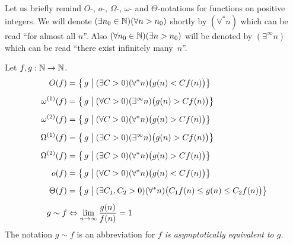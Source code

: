 		Let us briefly remind $O$-, $o$-, $\Omega$-, $\omega$- and $\Theta$-notations for functions on positive integers. We will denote $(\exists n_0 \in \N) (\forall n > n_0)$ shortly by $(\forall^* n)$ which can be read ``for almost all $n$''. Also $(\forall n_0 \in \N) (\exists n > n_0)$ will be denoted by $(\exists^\infty n)$ which can be read ``there exist infinitely many~$n$''.
		\begin{defn}
		\label{def:O}
		Let $f, g: \N \rightarrow \N$.
		\begin{align*}
			O(f) &= \bigl\{\, g \bigm| (\exists C > 0) (\forall^* n) \bigl(g(n) < C f(n)\bigr)\bigr\} \\[5pt]
			\omega^{(1)}(f) &= \bigl\{\, g \bigm| (\forall C > 0) (\exists^\infty n) \bigl(g(n) > C f(n)\bigr)\bigr\} \\[5pt]
			\omega^{(2)}(f) &= \bigl\{\, g \bigm| (\forall C > 0) (\forall^* n) \bigl(g(n) > C f(n)\bigr)\bigr\} \\[5pt]
			\Omega^{(1)}(f) &= \bigl\{\, g \bigm| (\exists C > 0) (\exists^\infty n) \bigl(g(n) > C f(n)\bigr)\bigr\} \\[5pt]
			\Omega^{(2)}(f) &= \bigl\{\, g \bigm| (\exists C > 0) (\forall^* n) \bigl(g(n) > C f(n)\bigr)\bigr\} \\[5pt]
			o(f) &= \bigl\{\, g \bigm| (\forall C > 0) (\forall^* n) \bigl(g(n) < C f(n)\bigr)\bigr\} \\[5pt]
			\Theta(f) &= \bigl\{\, g \bigm| (\exists C_1, C_2 > 0) (\forall^* n) \bigl(C_1 f(n) \leq g(n) \leq C_2 f(n)\bigr)\bigr\} \\[5pt]
			g \sim f &\iff \lim\limits_{n\to\infty} \frac{g(n)}{f(n)} = 1
		\end{align*}
		The notation $g \sim f$ is an abbreviation for {\em $f$ is asymptotically equivalent to $g$}.
		\end{defn}
		
